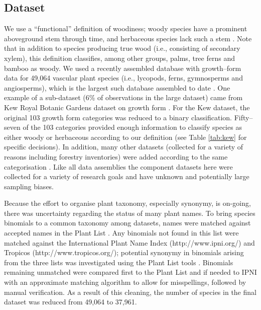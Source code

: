 \documentclass[a4paper,12pt]{article}
\begin{document}
\subsection{Dataset}

We use a ``functional'' definition of woodiness; woody species have a
prominent aboveground stem through time, and herbaceous species lack
such a stem \citep[see an early use of this definition
by][]{gray1887elements}.  Note that in addition to species producing
true wood (i.e., consisting of secondary xylem), this definition
classifies, among other groups, palms, tree ferns and bamboo as
woody.
%
We used a recently assembled database with growth--form data for 49,064
vascular plant species (i.e., lycopods, ferns,
gymnosperms and angiosperms), which is the largest such database assembled
to date \citep{Zanne}. 
%
One example of a sub-dataset (6\% of observations in the large dataset) came from Kew Royal Botanic
Gardens dataset on growth form \citep{Kew}.  For the Kew dataset, the
original 103 growth form categories was reduced to a binary
classification.  Fifty--seven of the 103 categories provided enough
information to classify species as either woody or herbaceous
according to our definition (see Table \ref{tab:kew} for specific
decisions).  In addition, many other datasets (collected for a
variety of reasons including forestry inventories) were added
according to the same categorisation \citep{Zanne}.  Like all data
assemblies the component datasets here were collected for a variety of
research goals and have unknown and potentially large sampling biases.

Because the effort to organise plant taxonomy, especially synonymy, is
on-going, there was uncertainty regarding the status of many plant
names.
%
To bring species binomials to a common taxonomy among datasets, names
were matched against accepted names in the Plant List
\citep{ThePlantList}.  Any binomials not found in this list were
matched against the International Plant Name Index
(http://www.ipni.org/) and Tropicos (http://www.tropicos.org/);
potential synonymy in binomials arising from the three lists was
investigated using the Plant List tools \citep{ThePlantList}.  
%
Binomials remaining unmatched were compared first to the Plant List
and if needed to IPNI with an approximate matching algorithm to allow
for misspellings, followed by manual verification. As a result of this 
cleaning, the number of species in the final dataset  was reduced 
from 49,064 to 37,961. 
\end{document}
